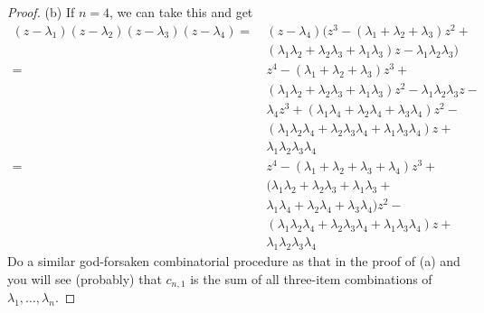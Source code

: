 \documentclass{article}
\theoremstyle{definition}
\begin{document}
\begin{proof}
	\item{(b)} If $n = 4$, we can take this and get \begin{align*}
		(z - \lambda_1)(z - \lambda_2)(z - \lambda_3)(z - \lambda_4) =\  & (z - \lambda_4)(z^3 - (\lambda_1 + \lambda_2 + \lambda_3) z^2 +                                           \\
		                                                                 & (\lambda_1 \lambda_2 + \lambda_2 \lambda_3 + \lambda_1 \lambda_3) z - \lambda_1 \lambda_2 \lambda_3)      \\
		=\                                                               & z^4 - (\lambda_1 + \lambda_2 + \lambda_3) z^3 +                                                           \\
		                                                                 & (\lambda_1 \lambda_2 + \lambda_2 \lambda_3 + \lambda_1 \lambda_3) z^2 - \lambda_1 \lambda_2 \lambda_3 z - \\
		                                                                 & \lambda_4 z^3 + (\lambda_1 \lambda_4 + \lambda_2 \lambda_4 + \lambda_3 \lambda_4) z^2 -                   \\
		                                                                 & (\lambda_1 \lambda_2 \lambda_4 + \lambda_2 \lambda_3 \lambda_4 + \lambda_1 \lambda_3 \lambda_4)z +        \\
		                                                                 & \lambda_1 \lambda_2 \lambda_3 \lambda_4                                                                   \\
		=\                                                               & z^4 - (\lambda_1 + \lambda_2 + \lambda_3 + \lambda_4)z^3 +                                                \\
		                                                                 & (\lambda_1 \lambda_2 + \lambda_2 \lambda_3 + \lambda_1 \lambda_3 +                                        \\
		                                                                 & \lambda_1 \lambda_4 + \lambda_2 \lambda_4 + \lambda_3 \lambda_4)z^2 -                                     \\
		                                                                 & (\lambda_1 \lambda_2 \lambda_4 + \lambda_2 \lambda_3 \lambda_4 + \lambda_1 \lambda_3 \lambda_4)z +        \\
		                                                                 & \lambda_1 \lambda_2 \lambda_3 \lambda_4
	\end{align*}
	Do a similar god-forsaken combinatorial procedure as that in the proof of (a) and you will see (probably) that $c_{n, 1}$ is the sum of all three-item combinations of $\lambda_1, \dots, \lambda_n$.
\end{proof}
\end{document}
